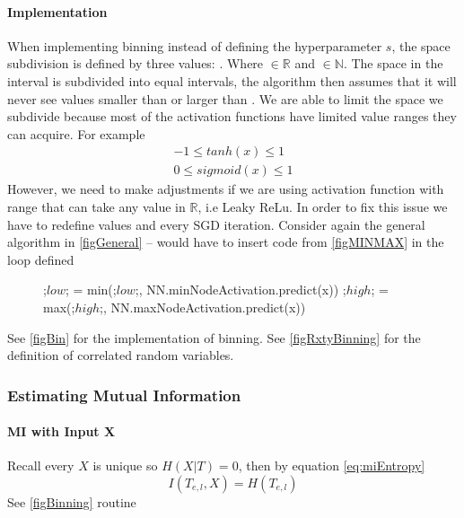 \documentclass[dissertation.tex]{subfiles}
\begin{document}
\paragraph{Implementation} When implementing binning instead of defining the
hyperparameter $s$, the space subdivision is defined by three values:
. Where 
$\in{\mathbb{R}}$ and
$\in{\mathbb{N}}$.
The space in the interval  is subdivided into
 equal intervals, the algorithm then assumes that it will never
see values smaller than  or larger than .     We
are able to limit the space we subdivide because most of the activation
functions have limited value ranges they can acquire. For example
\begin{gather}
  -1 \leq tanh(x) \leq 1\\
  0 \leq sigmoid(x) \leq 1
\end{gather}
However, we need to make adjustments if we are using activation function with
range that can take any value in $\mathbb{R}$, i.e Leaky ReLu. In order to fix
this issue we have to redefine values  and  every
SGD iteration. Consider again the general algorithm in \autoref{figGeneral} --
would have to insert code from \autoref{figMINMAX} in the loop defined
\begin{figure}[H]
  \begin{pythonfigure}
        ;$low$; = min(;$low$;, NN.minNodeActivation.predict(x))
        ;$high$; = max(;$high$;, NN.maxNodeActivation.predict(x))
  \end{pythonfigure}
  \caption{}
  \label{figMINMAX}
\end{figure}
See \autoref{figBin} for the implementation of binning. See
\autoref{figRxtyBinning} for the definition of correlated random variables.

\subsubsection{Estimating Mutual Information}

\paragraph{MI with Input X}
Recall every $X$ is unique so $H(X|T)=0$, then by equation
\autoref{eq:miEntropy}
\begin{equation}
  I(T_{e,l}, X) = H(T_{e,l})
\end{equation}
See \autoref{figBinning} routine 
\end{document}
